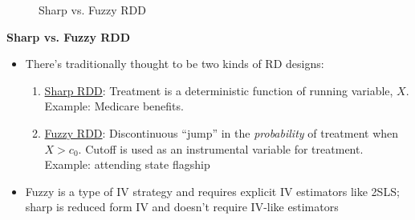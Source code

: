 \documentclass[notes=show]{beamer}
\begin{document}
\begin{frame}[plain]
\begin{figure}
\centering
{}
\caption{Sharp vs. Fuzzy RDD}
\end{figure}

	

\end{frame}

\begin{frame}[plain]

	\begin{center}
	\textbf{Sharp vs. Fuzzy RDD}
	\end{center}
	
\begin{itemize}
\item There's traditionally thought to be two kinds of RD designs:
	\begin{enumerate}
	\item \underline{Sharp RDD}: Treatment is a deterministic function of running variable, $X$. Example: Medicare benefits.  
	\item \underline{Fuzzy RDD}: Discontinuous ``jump'' in the \emph{probability} of treatment when $X>c_0$.  Cutoff is used as an instrumental variable for treatment.  Example: attending state flagship
	\end{enumerate}
\item Fuzzy is a type of IV strategy and requires explicit IV estimators like 2SLS; sharp is reduced form IV and doesn't require IV-like estimators
\end{itemize}	

\end{frame}	
\end{document}
